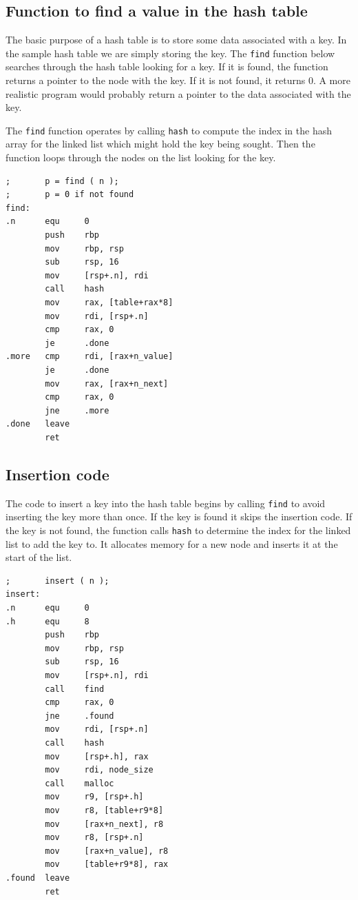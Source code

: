 \documentclass[11pt,b5paper]{book}
\begin{document}
\subsection{Function to find a value in the hash table}

The basic purpose of a hash table is to store some data associated
with a key.
In the sample hash table we are simply storing the key.
The {\tt find} function below searches through the hash table looking
for a key.
If it is found, the function returns a pointer to the node with
the key.
If it is not found, it returns 0.
A more realistic program would probably return a pointer to the data
associated with the key.

The {\tt find} function operates by calling {\tt hash} to compute the
index in the hash array for the linked list which might hold the key being sought.
Then the function loops through the nodes on the list looking for the
key.

\begin{verbatim}
;       p = find ( n );
;       p = 0 if not found
find:
.n      equ     0
        push    rbp
        mov     rbp, rsp
        sub     rsp, 16
        mov     [rsp+.n], rdi
        call    hash
        mov     rax, [table+rax*8]
        mov     rdi, [rsp+.n]
        cmp     rax, 0
        je      .done
.more   cmp     rdi, [rax+n_value]
        je      .done
        mov     rax, [rax+n_next]
        cmp     rax, 0
        jne     .more
.done   leave
        ret
\end{verbatim}

\subsection{Insertion code}

The code to insert a key into the hash table begins by calling
{\tt find} to avoid inserting the key more than once.
If the key is found it skips the insertion code.
If the key is not found, the function calls {\tt hash} to determine
the index for the linked list to add the key to.
It allocates memory for a new node and inserts it at the start of the
list.

\begin{verbatim}
;       insert ( n );
insert:
.n      equ     0
.h      equ     8
        push    rbp
        mov     rbp, rsp
        sub     rsp, 16
        mov     [rsp+.n], rdi
        call    find
        cmp     rax, 0
        jne     .found
        mov     rdi, [rsp+.n]
        call    hash
        mov     [rsp+.h], rax
        mov     rdi, node_size
        call    malloc
        mov     r9, [rsp+.h]
        mov     r8, [table+r9*8]
        mov     [rax+n_next], r8
        mov     r8, [rsp+.n]
        mov     [rax+n_value], r8
        mov     [table+r9*8], rax
.found  leave
        ret
\end{verbatim}
\end{document}
